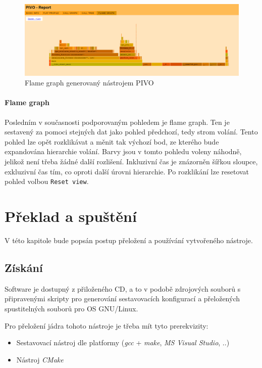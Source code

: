 \documentclass[czech,BP]{thesiskiv}
\begin{document}
\begin{figure}[h]
    \centering
    \includegraphics[interpolate,width=1.0\textwidth]{img/pivo_flame.png}
    \caption{Flame graph generovaný nástrojem PIVO}
    \label{obr:implflame}
\end{figure}

\subsubsection*{Flame graph}

Posledním v současnosti podporovaným pohledem je flame graph. Ten je sestavený za pomoci stejných dat jako pohled předchozí, tedy strom volání. Tento pohled lze opět rozklikávat a měnit tak výchozí bod, ze kterého bude expandována hierarchie volání. Barvy jsou v tomto pohledu voleny náhodně, jelikož není třeba žádné další rozlišení. Inkluzivní čas je znázorněn šířkou sloupce, exkluzivní čas tím, co  oproti další úrovni hierarchie. Po rozklikání lze resetovat pohled volbou \texttt{Reset view}.





\chapter{Překlad a spuštění}

V této kapitole bude popsán postup přeložení a používání vytvořeného nástroje.

\section{Získání}

Software je dostupný z přiloženého CD, a to v podobě zdrojových souborů s připravenými skripty pro generování sestavovacích konfigurací a přeložených spustitelných souborů pro OS GNU/Linux.

Pro přeložení jádra tohoto nástroje je třeba mít tyto prerekvizity:

\begin{itemize}
\item Sestavovací nástroj dle platformy (\emph{gcc} + \emph{make}, \emph{MS Visual Studio}, ..)
\item Nástroj \emph{CMake}
\end{itemize}
\end{document}
